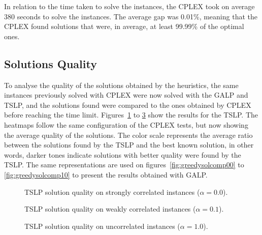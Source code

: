 In relation to the time taken to solve the instances, the CPLEX took on average 380 seconds to solve the instances. The average gap was 
0.01\%, meaning that the CPLEX found solutions that were, in average, at least 99.99\% of the optimal ones.

\subsection{Solutions Quality}

To analyse the quality of the solutions obtained by the heuristics, the same instances previously solved with CPLEX were now solved with
the GALP and TSLP, and the solutions found were compared to the ones obtained by CPLEX before reaching the time limit. 
Figures~\ref{fig:tabusolcomp00} to \ref{fig:tabusolcomp10} show the results for the TSLP. The heatmaps follow the same configuration 
of the CPLEX tests, but now showing the average quality of the solutions. The color scale represents
the average ratio between the solutions found by the TSLP and the best known solution, in other words, darker tones indicate solutions
with better quality were found by the TSLP. The same representations are used on figures~\ref{fig:greedysolcomp00} to \ref{fig:greedysolcomp10} 
to present the results obtained with GALP.

\begin{figure}[H]
  \centering
    \subfloat[1 resource]{}
    \subfloat[2 resources]{}
    \subfloat[4 resources]{}
  \caption{TSLP solution quality on strongly correlated instances ($\alpha = 0.0$).}
  \label{fig:tabusolcomp00}
\end{figure}

\begin{figure}[H]
  \centering
    \subfloat[1 resource]{}
    \subfloat[2 resources]{}
    \subfloat[4 resources]{}
  \caption{TSLP solution quality on weakly correlated instances ($\alpha = 0.1$).}
  \label{fig:tabusolcomp01}
\end{figure}

\begin{figure}[H]
  \centering
    \subfloat[1 resource]{} 
    \subfloat[2 resources]{}
    \subfloat[4 resources]{}
  \caption{TSLP solution quality on uncorrelated instances ($\alpha = 1.0$).}
  \label{fig:tabusolcomp10}
\end{figure}

